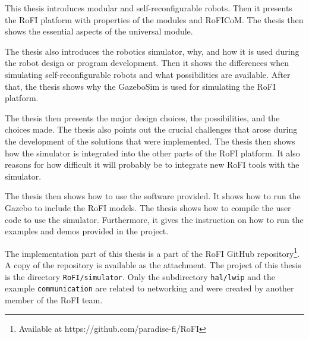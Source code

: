 \documentclass[
  printed, %
  color,   %
  notable, %
  oneside, %
  nolof,   %
  nolot,   %
  nocover,
]{fithesis3}
\newcommand{\code}[1]{\texttt{#1}}
\begin{document}
This thesis introduces modular and self-reconfigurable robots.
Then it presents the RoFI platform with properties of the modules and RoFICoM.
The thesis then shows the essential aspects of the universal module.

The thesis also introduces the robotics simulator, why, and how it is used during the robot design or program development.
Then it shows the differences when simulating self-reconfigurable robots and what possibilities are available.
After that, the thesis shows why the GazeboSim is used for simulating the RoFI platform.

The thesis then presents the major design choices, the possibilities, and the choices made.
The thesis also points out the crucial challenges that arose during the development of the solutions that were implemented.
The thesis then shows how the simulator is integrated into the other parts of the RoFI platform.
It also reasons for how difficult it will probably be to integrate new RoFI tools with the simulator.

The thesis then shows how to use the software provided.
It shows how to run the Gazebo to include the RoFI models.
The thesis shows how to compile the user code to use the simulator.
Furthermore, it gives the instruction on how to run the examples and demos provided in the project.

The implementation part of this thesis is a part of the RoFI GitHub repository\footnote{Available at https://github.com/paradise-fi/RoFI}.
A copy of the repository is available as the attachment.
The project of this thesis is the directory \code{RoFI/simulator}.
Only the subdirectory \code{hal/lwip} and the example \code{communication} are related to networking and were created by another member of the RoFI team.
\end{document}
